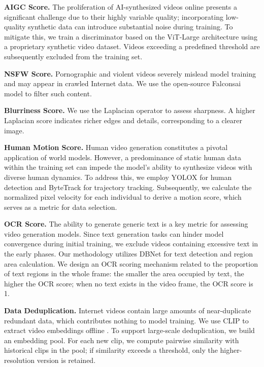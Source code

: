 \documentclass{llmxive}
\begin{document}
\textbf{AIGC Score.} The proliferation of AI-synthesized videos online presents a significant challenge due to their highly variable quality; incorporating low-quality synthetic data can introduce substantial noise during training. To mitigate this, we train a discriminator based on the ViT-Large architecture using a proprietary synthetic video dataset. Videos exceeding a predefined threshold are subsequently excluded from the training set.

\textbf{NSFW Score.} Pornographic and violent videos severely mislead model training and may appear in crawled Internet data. We use the open-source Falconsai model \cite{Falconsai2023nsfw} to filter such content. 

\textbf{Blurriness Score.} We use the Laplacian operator to assess sharpness. A higher Laplacian score indicates richer edges and details, corresponding to a clearer image.

\textbf{Human Motion Score.} Human video generation constitutes a pivotal application of world models. However, a predominance of static human data within the training set can impede the model's ability to synthesize videos with diverse human dynamics. To address this, we employ YOLOX \cite{ge2021yolox} for human detection and ByteTrack \cite{zhang2021bytetrack} for trajectory tracking. Subsequently, we calculate the normalized pixel velocity for each individual to derive a motion score, which serves as a metric for data selection.

\textbf{OCR Score.} The ability to generate generic text is a key metric for assessing video generation models. Since text generation tasks can hinder model convergence during initial training, we exclude videos containing excessive text in the early phases. Our methodology utilizes DBNet \cite{liao2019real} for text detection and region area calculation. We design an OCR scoring mechanism related to the proportion of text regions in the whole frame: the smaller the area occupied by text, the higher the OCR score; when no text exists in the video frame, the OCR score is 1.


\textbf{Data Deduplication.} Internet videos contain large amounts of near-duplicate redundant data, which contributes nothing to model training. We use CLIP to extract video embeddings offline . To support large-scale deduplication, we build an embedding pool. For each new clip, we compute pairwise similarity with historical clips in the pool; if similarity exceeds a threshold, only the higher-resolution version is retained.
\end{document}
